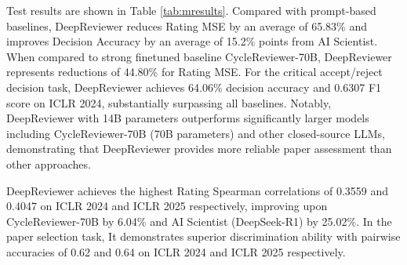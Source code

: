 \documentclass{article}
\begin{document}
Test results are shown in Table \ref{tab:mresults}. Compared with prompt-based baselines, DeepReviewer reduces Rating MSE by an average of 65.83$\%$ and improves Decision Accuracy by an average of 15.2$\%$ points from AI Scientist. When compared to strong finetuned baseline CycleReviewer-70B, DeepReviewer represents reductions of 44.80\% for Rating MSE. For the critical accept/reject decision task, DeepReviewer achieves 64.06\% decision accuracy and 0.6307 F1 score on ICLR 2024, substantially surpassing all baselines. Notably, DeepReviewer with 14B parameters outperforms significantly larger models including CycleReviewer-70B (70B parameters) and other closed-source LLMs, demonstrating that DeepReviewer provides more reliable paper assessment than other approaches. 


DeepReviewer achieves the highest Rating Spearman correlations of 0.3559 and 0.4047 on ICLR 2024 and ICLR 2025 respectively, improving upon CycleReviewer-70B by 6.04$\%$ and AI Scientist (DeepSeek-R1) by 25.02$\%$. In the paper selection task, It demonstrates superior discrimination ability with pairwise accuracies of 0.62 and 0.64 on ICLR 2024 and ICLR 2025 respectively.


\end{document}
